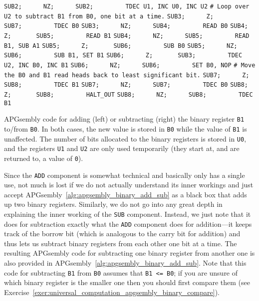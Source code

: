 \begin{apgsembly}
\begin{minipage}[t]{.49\textwidth}
\begin{algorithmic}
			\State \verb|SUB2;      NZ;      SUB2;         TDEC U1, INC U0, INC U2|
			\State \verb||
			\State \verb|# Loop over U2 to subtract B1 from B0, one bit at a time.|
			\State \verb|SUB3;      Z;       SUB7;         TDEC B0|
			\State \verb|SUB3;      NZ;      SUB4;         READ B0|
			\State \verb|SUB4;      Z;       SUB5;         READ B1|
			\State \verb|SUB4;      NZ;      SUB5;         READ B1, SUB A1|
			\State \verb|SUB5;      Z;       SUB6;         SUB B0|
			\State \verb|SUB5;      NZ;      SUB6;         SUB B1, SET B1|
			\State \verb|SUB6;      Z;       SUB3;         TDEC U2, INC B0, INC B1|
			\State \verb|SUB6;      NZ;      SUB6;         SET B0, NOP|
			\State \verb||
			\State \verb|# Move the B0 and B1 read heads back to least significant bit.|
			\State \verb|SUB7;      Z;       SUB8;         TDEC B1|
			\State \verb|SUB7;      NZ;      SUB7;         TDEC B0|
			\State \verb|SUB8;      Z;       SUB8;         HALT_OUT|
			\State \verb|SUB8;      NZ;      SUB8;         TDEC B1|
		\end{algorithmic}
	\end{minipage}
	\caption{APGsembly code for adding (left) or subtracting (right) the binary register \texttt{B1} to/from \texttt{B0}. In both cases, the new value is stored in \texttt{B0} while the value of \texttt{B1} is unaffected. The number of bits allocated to the binary registers is stored in \texttt{U0}, and the registers \texttt{U1} and \texttt{U2} are only used temporarily (they start at, and are returned to, a value of \texttt{0}).}\label{alg:apgsembly_binary_add_sub}
\end{apgsembly}

Since the \texttt{ADD} component is somewhat technical and basically only has a single use, not much is lost if we do not actually understand its inner workings and just accept APGsembly~\ref{alg:apgsembly_binary_add_sub} as a black box that adds up two binary registers. Similarly, we do not go into any great depth in explaining the inner working of the \texttt{SUB} component. Instead, we just note that it does for subtraction exactly what the \texttt{ADD} component does for addition---it keeps track of the borrow bit (which is analogous to the carry bit for addition) and thus lets us subtract binary registers from each other one bit at a time. The resulting APGsembly code for subtracting one binary register from another one is also provided in APGsembly~\ref{alg:apgsembly_binary_add_sub}. Note that this code for subtracting \texttt{B1} from \texttt{B0} assumes that \texttt{B1 <= B0}; if you are unsure of which binary register is the smaller one then you should first compare them (see Exercise~\ref{exer:universal_computation_apgsembly_binary_compare}).

